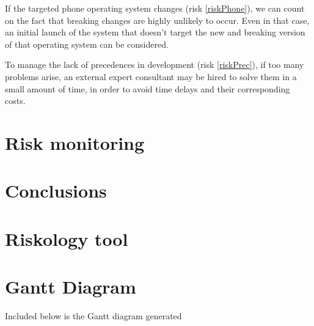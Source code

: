 \documentclass[11pt]{report}
\begin{document}
If the targeted phone operating system changes (risk \ref{riskPhone}), we can count on the fact that breaking changes are highly unlikely to occur. Even in that case, an initial launch of the system that doesn't target the new and breaking version of that operating system can be considered.

To manage the lack of precedences in development (risk \ref{riskPrec}), if too many problems arise, an external expert consultant may be hired to solve them in a small amount of time, in order to avoid time delays and their corresponding costs.


\chapter{Risk monitoring}
\label{chapRiskMonitoring}


\chapter{Conclusions}

\appendix

\chapter{Riskology tool}
\label{chapRiskology}


\chapter{Gantt Diagram}
\label{chapGantt}
Included below is the Gantt diagram generated


\end{document}
